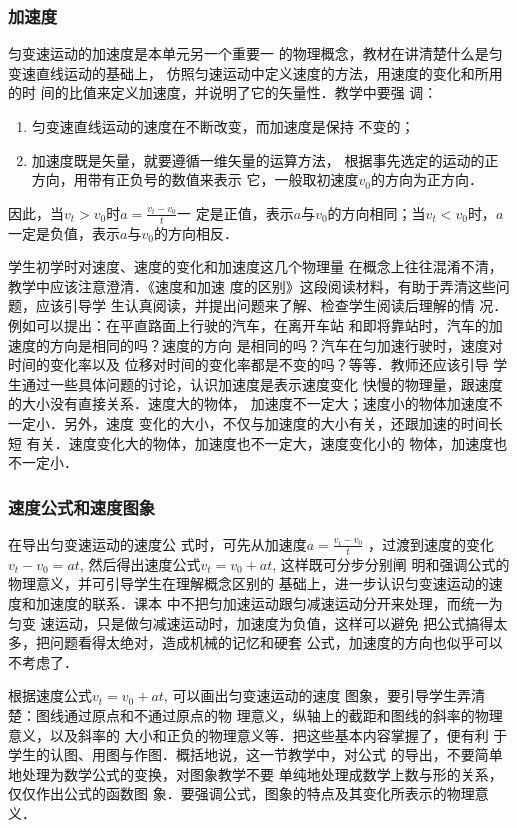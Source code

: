 \subsubsection{加速度}

匀变速运动的加速度是本单元另一个重要一
的物理概念，教材在讲清楚什么是匀变速直线运动的基础上，
仿照匀速运动中定义速度的方法，用速度的变化和所用的时
间的比值来定义加速度，并说明了它的矢量性．教学中要强
调：
\begin{enumerate}
    \item 匀变速直线运动的速度在不断改变，而加速度是保持
不变的；
\item 加速度既是矢量，就要遵循一维矢量的运算方法，
根据事先选定的运动的正方向，用带有正负号的数值来表示
它，一般取初速度$v_0$的方向为正方向．
\end{enumerate}
因此，当$v_t>v_0$时$a=\frac{v_t-v_0}{t}$一
定是正值，表示$a$与$v_0$的方向相同；当$v_t<v_0$时，$a$
一定是负值，表示$a$与$v_0$的方向相反．

学生初学时对速度、速度的变化和加速度这几个物理量
在概念上往往混淆不清，教学中应该注意澄清．《速度和加速
度的区别》这段阅读材料，有助于弄清这些问题，应该引导学
生认真阅读，并提出问题来了解、检查学生阅读后理解的情
况．例如可以提出：在平直路面上行驶的汽车，在离开车站
和即将靠站时，汽车的加速度的方向是相同的吗？速度的方向
是相同的吗？汽车在匀加速行驶时，速度对时间的变化率以及
位移对时间的变化率都是不变的吗？等等．教师还应该引导
学生通过一些具体问题的讨论，认识加速度是表示速度变化
快慢的物理量，跟速度的大小没有直接关系．速度大的物体，
加速度不一定大；速度小的物体加速度不一定小．另外，速度
变化的大小，不仅与加速度的大小有关，还跟加速的时间长短
有关．速度变化大的物体，加速度也不一定大，速度变化小的
物体，加速度也不一定小．

\subsubsection{速度公式和速度图象}
在导出匀变速运动的速度公
式时，可先从加速度$a=\frac{v_t-v_0}{t}$
，过渡到速度的变化$v_t-v_0=at$, 然后得出速度公式$v_t=v_0+at$, 这样既可分步分别阐
明和强调公式的物理意义，并可引导学生在理解概念区别的
基础上，进一步认识匀变速运动的速度和加速度的联系．课本
中不把匀加速运动跟匀减速运动分开来处理，而统一为匀变
速运动，只是做匀减速运动时，加速度为负值，这样可以避免
把公式搞得太多，把问题看得太绝对，造成机械的记忆和硬套
公式，加速度的方向也似乎可以不考虑了．

根据速度公式$v_t=v_0+at$, 可以画出匀变速运动的速度
图象，要引导学生弄清楚：图线通过原点和不通过原点的物
理意义，纵轴上的截距和图线的斜率的物理意义，以及斜率的
大小和正负的物理意义等．把这些基本内容掌握了，便有利
于学生的认图、用图与作图．概括地说，这一节教学中，对公式
的导出，不要简单地处理为数学公式的变换，对图象教学不要
单纯地处理成数学上数与形的关系，仅仅作出公式的函数图
象．要强调公式，图象的特点及其变化所表示的物理意义．

